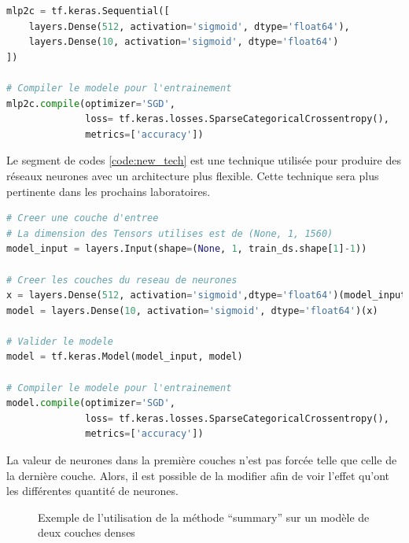 \documentclass{article}
\begin{document}
\begin{lstlisting}[language=Python, caption={Conception d'un perceptron multicouches}, label={code:add_layer}]
mlp2c = tf.keras.Sequential([
    layers.Dense(512, activation='sigmoid', dtype='float64'),
    layers.Dense(10, activation='sigmoid', dtype='float64')
])

# Compiler le modele pour l'entrainement
mlp2c.compile(optimizer='SGD',
              loss= tf.keras.losses.SparseCategoricalCrossentropy(),
              metrics=['accuracy'])
\end{lstlisting}

Le segment de codes \ref{code:new_tech} est une technique utilisée pour produire des réseaux neurones avec un architecture plus flexible. Cette technique sera plus pertinente dans les prochains laboratoires.

\begin{lstlisting}[language=Python, caption={Conception d'un perceptron multicouches (technique supplémentaire)}, label={code:new_tech}]
# Creer une couche d'entree
# La dimension des Tensors utilises est de (None, 1, 1560)
model_input = layers.Input(shape=(None, 1, train_ds.shape[1]-1))

# Creer les couches du reseau de neurones
x = layers.Dense(512, activation='sigmoid',dtype='float64')(model_input)
model = layers.Dense(10, activation='sigmoid', dtype='float64')(x)

# Valider le modele
model = tf.keras.Model(model_input, model)

# Compiler le modele pour l'entrainement
model.compile(optimizer='SGD',
              loss= tf.keras.losses.SparseCategoricalCrossentropy(),
              metrics=['accuracy'])
\end{lstlisting}


\medbreak
La valeur de neurones dans la première couches n'est pas forcée telle que celle de la dernière couche. Alors, il est possible de la modifier afin de voir l'effet qu'ont les différentes quantité de neurones.
\medbreak

\begin{figure}[H]
  \centering
  \caption{Exemple de l'utilisation de la méthode ``summary'' sur un modèle de deux couches denses}
  \label{fig:summary}
\end{figure}
\end{document}
